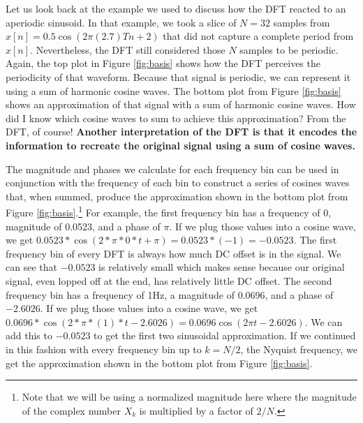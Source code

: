 Let us look back at the example we used to discuss how the DFT reacted to an aperiodic sinusoid.  In that example,
we took a slice of $N = 32$ samples from $x[n] = 0.5\cos(2\pi (2.7)Tn + 2)$ that did not capture a complete period
from $x[n]$.  Nevertheless, the DFT still considered those $N$ samples to be periodic.  Again, the top
plot in Figure \ref{fig:basis} shows how the DFT perceives the periodicity of that waveform.  
Because that signal is periodic, we can represent it using a sum of harmonic cosine waves.  The bottom plot from 
Figure \ref{fig:basis} shows an approximation of that signal with a sum of harmonic cosine waves.  How did I know 
which cosine waves to sum to achieve this approximation?  From the DFT, of course!  \textbf{Another interpretation of the
DFT is that it encodes the information to recreate the original signal using a sum of cosine waves.}


The magnitude and phases we calculate for each frequency bin
can be used in conjunction with the frequency of each bin to construct a series of cosines waves that,
when summed, produce the approximation shown in the bottom plot from Figure \ref{fig:basis}.\footnote{Note that 
we will be using a normalized magnitude here where the magnitude of the complex number $X_k$ is multiplied by
a factor of $2/N$.}  For example,
the first frequency bin has a frequency of 0, magnitude of 0.0523, and a phase of $\pi$.  If we plug those values 
into a cosine wave, we get $0.0523 * \cos(2 * \pi * 0 * t + \pi) = 0.0523 * (-1) = -0.0523$.  The first frequency bin
of every DFT is always how much DC offset is in the signal.  We can see that $-0.0523$ is relatively small which 
makes sense because our original signal, even lopped off at the end, has relatively little DC offset.  The second
 frequency bin has a frequency of 1Hz, a magnitude of 0.0696, and a phase of $-2.6026$.  If we plug those values into
 a cosine wave, we get $0.0696 * \cos(2 * \pi * (1) * t - 2.6026) = 0.0696\cos(2\pi t - 2.6026)$.  We can add this to
 $-0.0523$ to get the first two sinusoidal approximation.  If we continued in this fashion with every frequency bin
 up to $k = N/2$, the Nyquist frequency, we get the approximation shown in the bottom plot from 
 Figure \ref{fig:basis}.  
 
